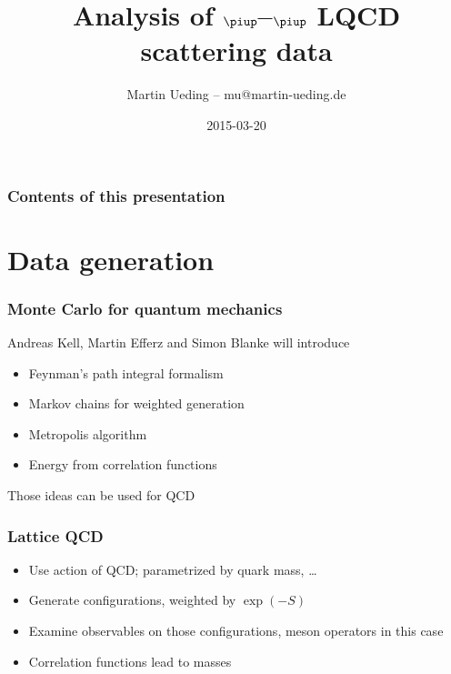 \documentclass[english, fleqn]{beamer}
\title{Analysis of $\piup$--$\piup$ LQCD scattering data}
\author{Martin Ueding – mu@martin-ueding.de}
\date{2015-03-20}
\begin{document}
\begin{frame}
    \titlepage
\end{frame}

\begin{frame}
    \frametitle{Contents of this presentation}
    \tableofcontents
\end{frame}


\section{Data generation}

\begin{frame}
    \frametitle{Monte Carlo for quantum mechanics}

    Andreas Kell, Martin Efferz and Simon Blanke will introduce
    \begin{itemize}
        \item
            Feynman's path integral formalism
        \item
            Markov chains for weighted generation
        \item
            Metropolis algorithm
        \item
            Energy from correlation functions
    \end{itemize}

    Those ideas can be used for QCD
\end{frame}

\begin{frame}
    \frametitle{Lattice QCD}

    \begin{itemize}
        \item
            Use action of QCD; parametrized by quark mass, …
        \item
            Generate configurations, weighted by $\exp(-S)$
        \item
            Examine observables on those configurations, meson operators in
            this case
        \item
            Correlation functions lead to masses
    \end{itemize}
\end{frame}

\end{document}
